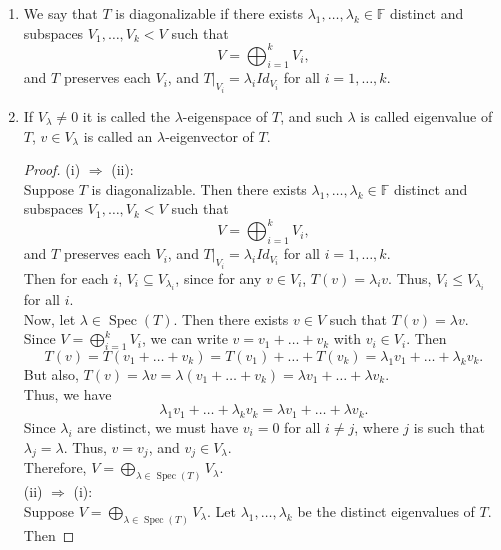 \documentclass{article}
\begin{document}
\begin{enumerate}
    \item We say that $T$ is diagonalizable if there exists $\lambda_1, \ldots, \lambda_k \in \mathbb{F}$ distinct and subspaces $V_1, \ldots, V_k < V$ such that
    \[
    V = \bigoplus_{i=1}^k V_i,
    \]
    and $T$ preserves each $V_i$, and $T|_{V_i} = \lambda_i Id_{V_i}$ for all $i = 1, \ldots, k$.
    
    \item If $V_{\lambda} \neq 0$ it is called the $\lambda$-eigenspace of $T$, and such $\lambda$ is called eigenvalue of $T$, $v \in V_{\lambda}$ is called an $\lambda$-eigenvector of $T$. \\
    \begin{proof}
        (i) $\Rightarrow$ (ii): \\
        Suppose $T$ is diagonalizable. Then there exists $\lambda_1, \ldots, \lambda_k \in \mathbb{F}$ distinct and subspaces $V_1, \ldots, V_k < V$ such that
        \[
        V = \bigoplus_{i=1}^k V_i,
        \]
        and $T$ preserves each $V_i$, and $T|_{V_i} = \lambda_i Id_{V_i}$ for all $i = 1, \ldots, k$. \\
        Then for each $i$, $V_i \subseteq V_{\lambda_i}$, since for any $v \in V_i$, $T(v) = \lambda_i v$. Thus, $V_i \leq V_{\lambda_i}$ for all $i$. \\
        Now, let $\lambda \in \operatorname{Spec}(T)$. Then there exists $v \in V$ such that $T(v) = \lambda v$. Since $V = \bigoplus_{i=1}^k V_i$, we can write $v = v_1 + \ldots + v_k$ with $v_i \in V_i$. Then
        \[
        T(v) = T(v_1 + \ldots + v_k) = T(v_1) + \ldots + T(v_k) = \lambda_1 v_1 + \ldots + \lambda_k v_k.
        \]
        But also, $T(v) = \lambda v = \lambda (v_1 + \ldots + v_k) = \lambda v_1 + \ldots + \lambda v_k$. \\
        Thus, we have
        \[
        \lambda_1 v_1 + \ldots + \lambda_k v_k = \lambda v_1 + \ldots + \lambda v_k.
        \]
        Since $\lambda_i$ are distinct, we must have $v_i = 0$ for all $i \neq j$, where $j$ is such that $\lambda_j = \lambda$. Thus, $v = v_j$, and $v_j \in V_{\lambda}$. \\
        Therefore, $V = \bigoplus_{\lambda \in \operatorname{Spec}(T)} V_{\lambda}$. \\
        (ii) $\Rightarrow$ (i): \\
        Suppose $V = \bigoplus_{\lambda \in \operatorname{Spec}(T)} V_{\lambda}$. Let $\lambda_1, \ldots, \lambda_k$ be the distinct eigenvalues of $T$. Then

\end{proof}
\end{enumerate}
\end{document}
